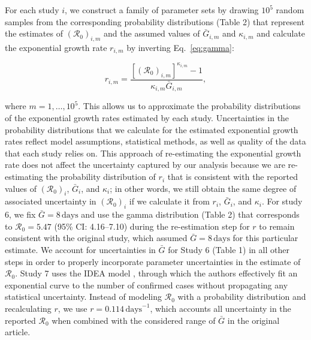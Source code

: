 \documentclass[12pt]{article}
\newcommand{\eref}[1]{Eq.~\ref{eq:#1}}
\newcommand{\Ro}{\ensuremath{{\mathcal R}_{0}}\xspace}
\begin{document}
For each study $i$, we construct a family of parameter sets by drawing $10^5$ random samples from the corresponding probability distributions (Table 2) that represent the estimates of $(\Ro)_{i,m}$ and the assumed values of $\bar G_{i,m}$ and $\kappa_{i,m}$ and calculate the exponential growth rate $r_{i,m}$ by inverting \eref{gamma}:
\begin{linenomath*}
\begin{equation}
r_{i,m} = \frac{\left[(\Ro)_{i,m}\right]^{\kappa_{i,m}} - 1}{\kappa_{i,m} \bar{G}_{i,m}},
\end{equation}
\end{linenomath*}
where $m=1,\dots,10^5$.
This allows us to approximate the probability distributions of the exponential growth rates estimated by each study.
Uncertainties in the probability distributions that we calculate for the estimated exponential growth rates reflect model assumptions, statistical methods, as well as quality of the data that each study relies on.
This approach of re-estimating the exponential growth rate does not affect the uncertainty captured by our analysis because we are re-estimating the probability distribution of $r_i$ that is consistent with the reported values of $(\Ro)_i$, $\bar G_i$, and $\kappa_i$;
in other words, we still obtain the same degree of associated uncertainty in $(\Ro)_i$ if we calculate it from $r_i$, $\bar G_i$, and $\kappa_i$.
For study 6, we fix $\bar G=8\,\textrm{days}$ and use the gamma distribution (Table 2) that corresponds to $\mathcal R_0 = 5.47$ (95\% CI: 4.16--7.10) during the re-estimation step for $r$ to remain consistent with the original study, which assumed $\bar G=8\,\textrm{days}$ for this particular estimate.
We account for uncertainties in $\bar G$ for Study 6 (Table 1) in all other steps in order to properly incorporate parameter uncertainties in the estimate of \Ro.
Study 7 uses the IDEA model \citep{fisman2013idea}, through which the authors effectively fit an exponential curve to the number of confirmed cases without propagating any statistical uncertainty.
Instead of modeling \Ro with a probability distribution and recalculating $r$, we use $r=0.114\,\mathrm{days}^{-1}$, which accounts all uncertainty in the reported \Ro when combined with the considered range of $\bar G$ in the original article.
\end{document}
